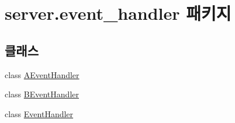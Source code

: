 \hypertarget{namespaceserver_1_1event__handler}{\section{server.\-event\-\_\-handler 패키지}
\label{namespaceserver_1_1event__handler}
}
\subsection*{클래스}
\begin{DoxyCompactItemize}
\item 
class \hyperlink{classserver_1_1event__handler_1_1_a_event_handler}{A\-Event\-Handler}
\item 
class \hyperlink{classserver_1_1event__handler_1_1_b_event_handler}{B\-Event\-Handler}
\item 
class \hyperlink{classserver_1_1event__handler_1_1_event_handler}{Event\-Handler}
\end{DoxyCompactItemize}
